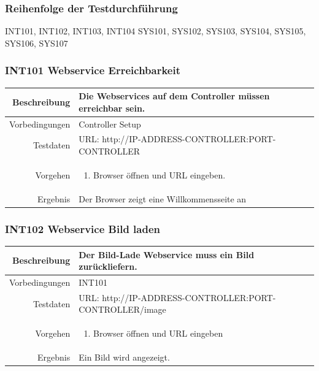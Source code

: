 \subsubsection{Reihenfolge der Testdurchführung}
INT101, INT102, INT103, INT104
SYS101, SYS102, SYS103, SYS104, SYS105, SYS106, SYS107




\subsubsection{INT101 Webservice Erreichbarkeit}
\begin{table}[h!]
	\renewcommand{\arraystretch}{1.5}
	\begin{tabular}{|r|p{14cm}|}
		\hline Beschreibung & Die Webservices auf dem Controller müssen erreichbar sein. \\ 
		\hline Vorbedingungen & Controller Setup \\ 
		\hline Testdaten & URL: http://IP-ADDRESS-CONTROLLER:PORT-CONTROLLER \\ 
		\hline Vorgehen & 
		\begin{enumerate}
			\item Browser öffnen und URL eingeben.
		\end{enumerate} \\ 
		\hline Ergebnis & Der Browser zeigt eine Willkommensseite an \\ 
		\hline 
	\end{tabular}
\end{table}

\subsubsection{INT102 Webservice Bild laden}
\begin{table}[h!]
	\renewcommand{\arraystretch}{1.5}
	\begin{tabular}{|r|p{14cm}|}
		\hline Beschreibung & Der Bild-Lade Webservice muss ein Bild zurückliefern. \\ 
		\hline Vorbedingungen & INT101 \\ 
		\hline Testdaten & URL: http://IP-ADDRESS-CONTROLLER:PORT-CONTROLLER/image \\ 
		\hline Vorgehen & 
		\begin{enumerate}
			\item Browser öffnen und URL eingeben
		\end{enumerate} \\ 
		\hline Ergebnis & Ein Bild wird angezeigt. \\ 
		\hline 
	\end{tabular}
\end{table}

